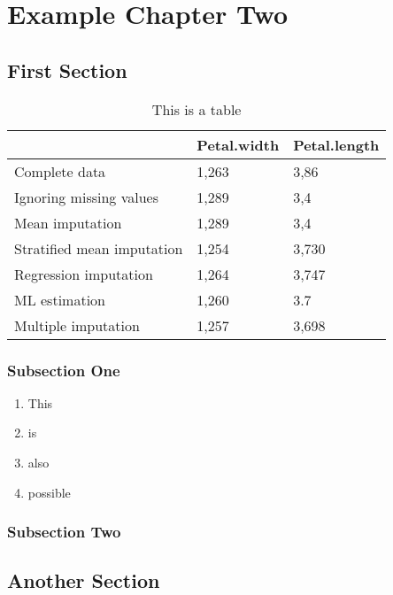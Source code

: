 \chapter{Example Chapter Two}

\section{First Section}

\begin{table}[]
    \centering
    \begin{tabular}{@{}lll@{}}
        \toprule
                                   & Petal.width & Petal.length \\ \midrule
        Complete data              & 1,263       & 3,86         \\
        Ignoring missing values    & 1,289       & 3,4          \\
        Mean imputation            & 1,289       & 3,4          \\
        Stratified mean imputation & 1,254       & 3,730        \\
        Regression imputation      & 1,264       & 3,747        \\
        ML estimation              & 1,260       & 3.7          \\
        Multiple imputation        & 1,257       & 3,698        \\ \bottomrule
    \end{tabular}
    \caption{This is a table}
    \label{tab:my-table}
\end{table}

\subsection{Subsection One}
\lipsum[1-3]

\begin{enumerate}[label=(\roman*)]

    \item This
    \item is
    \item also
    \item possible
\end{enumerate}

\subsection{Subsection Two}

\lipsum[4-5]

\section{Another Section}

\lipsum[6-13]



